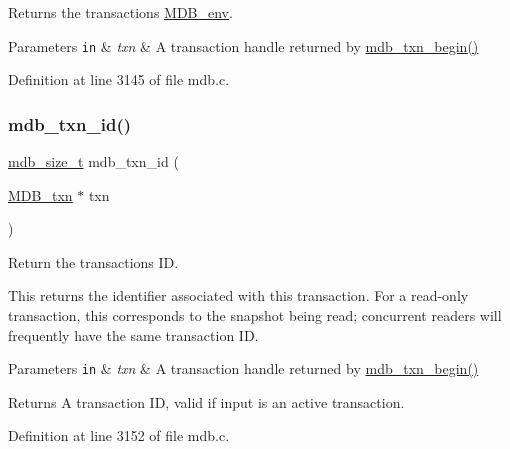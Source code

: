 Returns the transaction\textquotesingle{}s \mbox{\hyperlink{struct_m_d_b__env}{M\+D\+B\+\_\+env}}. 


\begin{DoxyParams}[1]{Parameters}
\mbox{\tt in}  & {\em txn} & A transaction handle returned by \mbox{\hyperlink{group__mdb_gad7ea55da06b77513609efebd44b26920}{mdb\+\_\+txn\+\_\+begin()}} \\
\hline
\end{DoxyParams}


Definition at line 3145 of file mdb.\+c.

\mbox{\label{group__internal_ga7b057cd5215b52b5bfa85d30699d3c8d}} 
\subsubsection{\texorpdfstring{mdb\+\_\+txn\+\_\+id()}{mdb\_txn\_id()}}
{\footnotesize\ttfamily \mbox{\hyperlink{lmdb_8h_a78821971e612e3898ef4b3ae45ed86f1}{mdb\+\_\+size\+\_\+t}} mdb\+\_\+txn\+\_\+id (\begin{DoxyParamCaption}\item[{\mbox{\hyperlink{struct_m_d_b__txn}{M\+D\+B\+\_\+txn}} $\ast$}]{txn }\end{DoxyParamCaption})}



Return the transaction\textquotesingle{}s ID. 

This returns the identifier associated with this transaction. For a read-\/only transaction, this corresponds to the snapshot being read; concurrent readers will frequently have the same transaction ID.


\begin{DoxyParams}[1]{Parameters}
\mbox{\tt in}  & {\em txn} & A transaction handle returned by \mbox{\hyperlink{group__mdb_gad7ea55da06b77513609efebd44b26920}{mdb\+\_\+txn\+\_\+begin()}} \\
\hline
\end{DoxyParams}
\begin{DoxyReturn}{Returns}
A transaction ID, valid if input is an active transaction. 
\end{DoxyReturn}


Definition at line 3152 of file mdb.\+c.

\mbox{\label{group__internal_ga6c6f917959517ede1c504cf7c720ce6d}} 
